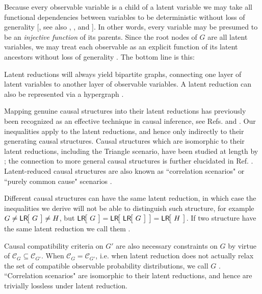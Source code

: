 Because every observable variable is a child of a latent variable we may take all functional dependencies between variables to be deterministic without loss of generality [\citealp[Conj.~4.5]{BeyondBellII}, see also \citealp{FineTheorem}, \citealp{SpekkensDeterminism}, and \citealp[Rmk.~2.3]{fritz2012bell}]. 
In other words, every variable may be presumed to be an \emph{injective function} of its parents. Since the root nodes of $G$ are all latent variables, we may treat each observable as an explicit function of its latent ancestors without loss of generality \citep[Sec.~4]{lee2015causalinference}. The bottom line is this: 

Latent reductions will always yield bipartite graphs, connecting one layer of latent variables to another layer of observable variables. A latent reduction can also be represented via a hypergraph \citep[Def.~3.2]{fritz2012bell}. 

Mapping genuine causal structures into their latent reductions has previously been recognized as an effective technique in causal inference, see Refs. \citep[Thm. 2.4]{fritz2012bell} and \citep[Sec. 5]{BilocalCorrelations}. Our inequalities apply to the latent reductions, and hence only indirectly to their generating causal structures. Causal structures which are isomorphic to their latent reductions, including the Triangle scenario, have been studied at length by \citet{fritz2012bell}; the connection to more general causal structures is further elucidated in Ref. \cite{BeyondBellII}. Latent-reduced causal structures are also known as ``correlation scenarios" \cite{fritz2012bell} or ``purely common cause" scenarios \cite{lee2015causalinference}.


Different causal structures can have the same latent reduction, in which case the inequalities we derive will not be able to distinguish such structure, for example $G\neq \NamedFunction{LR}{\!G\!}\neq H$, but $\NamedFunction{LR}{\!G\!}= \NamedFunction{LR}{\!\NamedFunction{LR}{\!G\!}\!}= \NamedFunction{LR}{\!H\!}$. If two structure have the same latent reduction we call them .

Causal compatibility criteria on $G'$ are also necessary constraints on $G$ by virtue of $\mathcal{C}_G \subseteq \mathcal{C}_{G'}$. When  $\mathcal{C}_G = \mathcal{C}_{G'}$, i.e. when latent reduction does not actually relax the set of compatible observable probability distributions, we call $G$ .  ``Correlation scenarios" \cite{fritz2012bell} are isomorphic to their latent reductions, and hence are trivially lossless under latent reduction. 

